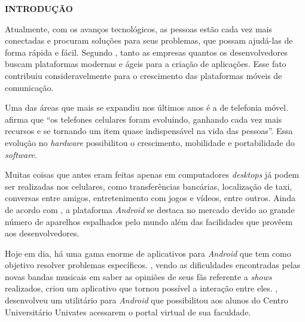   \vspace{1.2em}
  \textbf{\large INTRODUÇÃO}
  \vspace{2.9em}
\thispagestyle{empty}


	\par Atualmente, com os avanços tecnológicos, as pessoas estão cada vez
mais conectadas e procuram soluções para seus problemas, que possam ajudá-las
de forma rápida e fácil.  Segundo , tanto as empresas
quantos os desenvolvedores buscam plataformas modernas e ágeis para a criação
de aplicações. Esse fato contribuiu consideravelmente para o crescimento das
plataformas móveis de comunicação.

	\par Uma das áreas que mais se expandiu nos últimos anos é a de telefonia
móvel.  afirma que “os telefones celulares
foram evoluindo, ganhando cada vez mais recursos e se tornando um item quase
indispensável na vida das pessoas”. Essa evolução no \textit{hardware}
possibilitou o crescimento, mobilidade e portabilidade do \textit{software}.

	\par Muitas coisas que antes eram feitas apenas em computadores
\textit{desktops} já podem ser realizadas nos celulares, como
transferências bancárias, localização de taxi, conversas entre amigos,
entretenimento com jogos e vídeos, entre outros. Ainda de acordo com
, a plataforma \textit{Android} se destaca no
mercado devido ao grande número de aparelhos espalhados pelo mundo
além das facilidades que provêem aos desenvolvedores.

	\par Hoje em dia, há uma gama enorme de aplicativos para \textit{Android}
que tem como objetivo resolver problemas específicos. ,
vendo as dificuldades encontradas pelas novas bandas musicais em saber as opiniões
de seus fãs referente a \textit{shows} realizados, criou um aplicativo que tornou
possível a interação entre eles. , desenvolveu um utilitário
para \textit{Android} que possibilitou aos alunos do Centro Universitário Univates
acessarem o portal virtual de sua faculdade.


